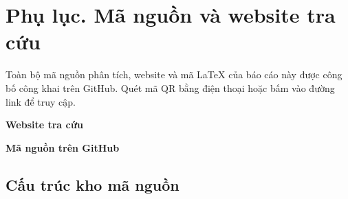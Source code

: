 \section*{Phụ lục. Mã nguồn và website tra cứu}

Toàn bộ mã nguồn phân tích, website và mã LaTeX của báo cáo này được công bố công khai trên GitHub. Quét mã QR bằng điện thoại hoặc bấm vào đường link để truy cập.

\begin{center}
  \begin{minipage}[t]{0.45\linewidth}
    \centering
    \QRLink{3.2cm}{\LinkWeb}\par\medskip
    \textbf{Website tra cứu}\par
    {\small\WebURL}
  \end{minipage}\hfill
  \begin{minipage}[t]{0.45\linewidth}
    \centering
    \QRLink{3.2cm}{\LinkGitHub}\par\medskip
    \textbf{Mã nguồn trên GitHub}\par
    {\small\GitHubURL}
  \end{minipage}
\end{center}

\subsection*{Cấu trúc kho mã nguồn}


